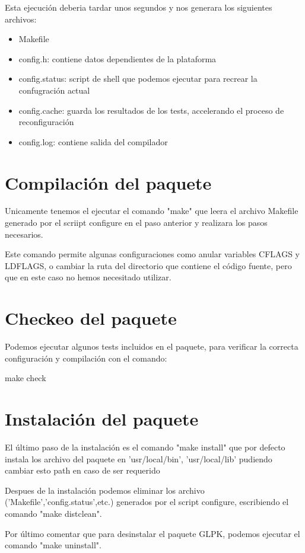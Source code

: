 \documentclass[11pt]{article}
\begin{document}
Esta ejecución deberia tardar unos segundos y nos generara los siguientes archivos:

\begin{itemize}
    \item Makefile
    \item config.h: contiene datos dependientes de la plataforma
    \item config.status: script de shell que podemos ejecutar para recrear la confugración actual
    \item config.cache: guarda los resultados de los tests, accelerando el proceso de reconfiguración
    \item config.log: contiene salida del compilador
\end{itemize}

   

\section*{Compilación del paquete}

Unicamente tenemos el ejecutar el comando "make" que leera el archivo Makefile generado por el scriipt configure en el paso anterior y realizara los pasos necesarios.

Este comando permite algunas configuraciones como anular variables CFLAGS y LDFLAGS, o cambiar la ruta del directorio que contiene el código fuente, pero que en este caso no hemos necesitado utilizar.

\section*{Checkeo del paquete}

Podemos ejecutar algunos tests incluidos en el paquete, para verificar la correcta configuración y compilación con el comando:

\begin{center}make check \end{center}


\section*{Instalación del paquete}

El último paso de la instalación es el comando "make install" que por defecto instala los archivo del paquete en 'usr/local/bin', 'usr/local/lib' pudiendo cambiar esto path en caso de ser requerido

Despues de la instalación podemos eliminar los archivo ('Makefile','config.status',etc.) generados por el script configure, escribiendo el comando "make distclean".

Por último comentar que para desinstalar el paquete GLPK, podemos ejecutar el comando "make uninstall".





\end{document}
